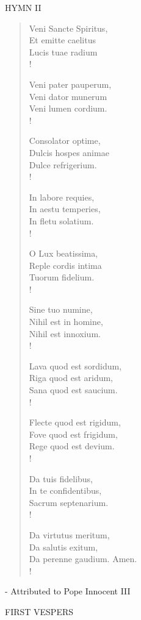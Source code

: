\noindent\small{\uppercase{Hymn II}}\normalsize
\begin{verse}
Veni Sancte Spiritus,\\
Et emitte caelitus\\
Lucis tuae radium\\!

Veni pater pauperum,\\
Veni dator munerum\\
Veni lumen cordium.\\!

Consolator optime,\\
Dulcis hospes animae\\
Dulce refrigerium.\\!

In labore requies,\\
In aestu temperies,\\
In fletu solatium.\\!

O Lux beatissima,\\
Reple cordis intima\\
Tuorum fidelium.\\!

Sine tuo numine,\\
Nihil est in homine,\\
Nihil est innoxium.\\!

Lava quod est sordidum,\\
Riga quod est aridum,\\
Sana quod est saucium.\\!

Flecte quod est rigidum,\\
Fove quod est frigidum,\\
Rege quod est devium.\\!

Da tuis fidelibus,\\
In te confidentibus,\\
Sacrum septenarium.\\!

Da virtutus meritum,\\
Da salutis exitum,\\
Da perenne gaudium. Amen.\\!
\end{verse}
- Attributed to Pope Innocent III

\begin{flushleft}\normalsize FIRST VESPERS\\\end{flushleft}


